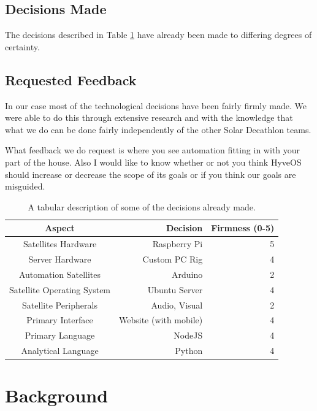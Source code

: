 	\subsection{Decisions Made}
	
		The decisions described in Table \ref{decision-matrix} have already been made to differing degrees of certainty.
		
	\subsection{Requested Feedback}
	
		In our case most of the technological decisions have been fairly firmly made.
		We were able to do this through extensive research and with the knowledge that what we do can be done fairly independently of the other Solar Decathlon teams.
		
		What feedback we do request is where you see automation fitting in with your part of the house.
		Also I would like to know whether or not you think HyveOS should increase or decrease the scope of its goals or if you think our goals are misguided.

		\begin{table}
			\centering
			\begin{tabular}{c|r|r}
				\toprule
					Aspect & Decision & Firmness (0-5) \\
				\midrule
					Satellites Hardware & Raspberry Pi & 5 \\
					Server Hardware & Custom PC Rig & 4 \\
					Automation Satellites & Arduino & 2 \\
					Satellite Operating System & Ubuntu Server & 4 \\
					Satellite Peripherals & Audio, Visual & 2 \\
					Primary Interface & Website (with mobile) & 4 \\
					Primary Language & NodeJS & 4 \\
					Analytical Language & Python & 4 \\
					\bottomrule
			\end{tabular}
			\label{decision-matrix}
			\caption{A tabular description of some of the decisions already made.}
		\end{table}


\section{Background}
	
